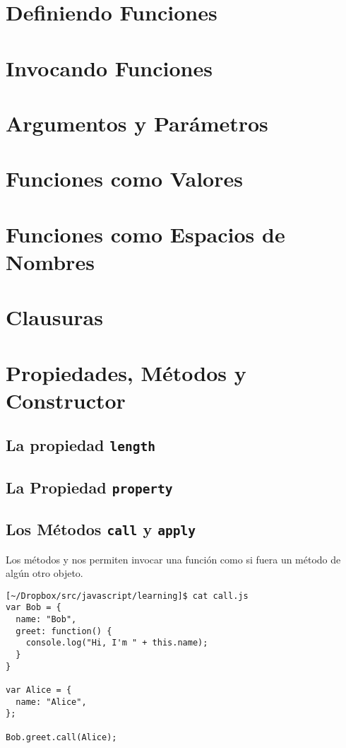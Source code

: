 \section{Definiendo Funciones}

\section{Invocando Funciones}

\section{Argumentos y Parámetros}

\section{Funciones como Valores}

\section{Funciones como Espacios de Nombres}

\section{Clausuras}

\section{Propiedades, Métodos y Constructor}

\subsection{La propiedad {\tt length}}

\subsection{La Propiedad {\tt property}}

\subsection{Los Métodos {\tt call} y {\tt apply}}
\label{subsection:callyapply}
Los métodos  y  nos permiten
invocar una función como si fuera un método de algún otro 
objeto.

\begin{verbatim}
[~/Dropbox/src/javascript/learning]$ cat call.js 
var Bob = {
  name: "Bob",
  greet: function() {
    console.log("Hi, I'm " + this.name);
  }
}
 
var Alice = {
  name: "Alice",
};

Bob.greet.call(Alice);
\end{verbatim}

